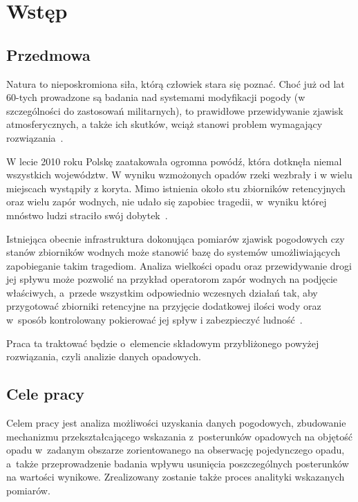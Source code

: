 \chapter{Wstęp}
\section{Przedmowa}
Natura to nieposkromiona siła, którą człowiek stara się poznać. Choć już od lat 60-tych prowadzone są badania nad systemami modyfikacji pogody (w szczególności do zastosowań militarnych), to prawidłowe przewidywanie zjawisk atmosferycznych, a także ich skutków, wciąż stanowi problem wymagający rozwiązania~\cite{systemy_kontroli_pogody}.

W lecie 2010 roku Polskę zaatakowała ogromna powódź, która dotknęła niemal wszystkich województw. W wyniku wzmożonych opadów rzeki wezbrały i w wielu miejscach wystąpiły z koryta. Mimo istnienia około stu zbiorników retencyjnych oraz wielu zapór wodnych, nie udało się zapobiec tragedii, w~wyniku której mnóstwo ludzi straciło swój dobytek~\cite{powodz}.

Istniejąca obecnie infrastruktura dokonująca pomiarów zjawisk pogodowych czy stanów zbiorników wodnych może stanowić bazę do systemów umożliwiających zapobieganie takim tragediom. Analiza wielkości opadu oraz przewidywanie drogi jej spływu może pozwolić na przykład operatorom zapór wodnych na podjęcie właściwych, a~przede wszystkim odpowiednio wczesnych działań tak, aby przygotować zbiorniki retencyjne na przyjęcie dodatkowej ilości wody oraz w~sposób kontrolowany pokierować jej spływ i zabezpieczyć ludność~\cite{bodziony, imgw}.

Praca ta traktować będzie o~elemencie składowym przybliżonego powyżej rozwiązania, czyli analizie danych opadowych.

\section{Cele pracy}
\label{sec:cele}
Celem pracy jest analiza możliwości uzyskania danych pogodowych, zbudowanie mechanizmu przekształcającego wskazania z~posterunków opadowych na objętość opadu w~zadanym obszarze zorientowanego na obserwację pojedynczego opadu, a~także przeprowadzenie badania wpływu usunięcia poszczególnych posterunków na wartości wynikowe. Zrealizowany zostanie także proces analityki wskazanych pomiarów. 


